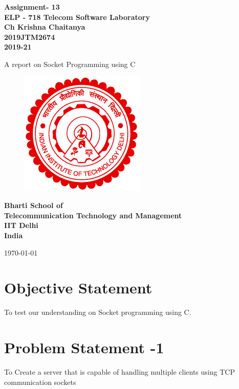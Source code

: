 \documentclass[12pt]{article}
\begin{document}
  \begin{titlepage}
    \begin{center}
      \begin{Large}
      \textbf{ Assignment- 13\\
       \vspace*{0.5cm}
       ELP - 718 Telecom Software Laboratory\\
       \vspace{1cm}
       Ch Krishna Chaitanya\\
       2019JTM2674\\
       2019-21\\}
      \end{Large}
       \vspace{1cm}
      {\Large  A report on Socket Programming using C}
       \vfill
       \begin{figure}[h!]
          \centering
          \includegraphics{iitdelhi.png}
       \end{figure}
       \vfill
      \begin{Large}
      \textbf{ Bharti School of \\
       Telecommunication Technology and Management\\
       IIT Delhi\\
       India\\
      }\end{Large}
       \medskip
       \today
    \end{center}
    \vfill
  \end{titlepage}
  
  \tableofcontents
  
  \clearpage
  \section*{Objective Statement}
   To test our understanding on Socket programming using C.

  \section{Problem Statement -1}
 To Create a server that is capable of handling multiple clients using TCP communication sockets
 
\end{document}
